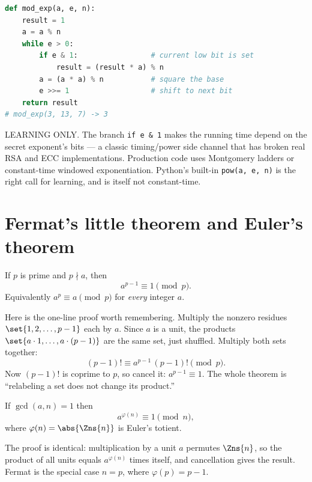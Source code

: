 \begin{implementbox}
\begin{lstlisting}[language=Python]
def mod_exp(a, e, n):
    result = 1
    a = a % n
    while e > 0:
        if e & 1:                 # current low bit is set
            result = (result * a) % n
        a = (a * a) % n           # square the base
        e >>= 1                   # shift to next bit
    return result
# mod_exp(3, 13, 7) -> 3
\end{lstlisting}
LEARNING ONLY. The branch \texttt{if e \& 1} makes the running time depend on the secret exponent's
bits --- a classic timing/power side channel that has broken real RSA and ECC implementations.
Production code uses Montgomery ladders or constant-time windowed exponentiation. Python's built-in
\texttt{pow(a, e, n)} is the right call for learning, and is itself not constant-time.
\end{implementbox}

\section{Fermat's little theorem and Euler's theorem}
\label{ch40:fermateuler}

\begin{theorem}
\label{ch40:thm-fermat}
If $p$ is prime and $p \nmid a$, then
\[
  a^{p-1} \equiv 1 \pmod p.
\]
Equivalently $a^p \equiv a \pmod p$ for \emph{every} integer $a$.
\end{theorem}

\begin{whybox}
Here is the one-line proof worth remembering. Multiply the nonzero residues
$\set{1,2,\dots,p-1}$ each by $a$. Since $a$ is a unit, the products $\set{a\cdot 1,\dots,a\cdot
(p-1)}$ are the same set, just shuffled. Multiply both sets together:
\[
  (p-1)! \equiv a^{p-1}\,(p-1)! \pmod p.
\]
Now $(p-1)!$ is coprime to $p$, so cancel it: $a^{p-1}\equiv 1$. The whole theorem is ``relabeling
a set does not change its product.''
\end{whybox}

\begin{theorem}
\label{ch40:thm-euler}
If $\gcd(a,n)=1$ then
\[
  a^{\varphi(n)} \equiv 1 \pmod n,
\]
where $\varphi(n) = \abs{\Zns{n}}$ is Euler's totient.
\end{theorem}

The proof is identical: multiplication by a unit $a$ permutes $\Zns{n}$, so the product of all units
equals $a^{\varphi(n)}$ times itself, and cancellation gives the result. Fermat is the special case
$n=p$, where $\varphi(p)=p-1$.

